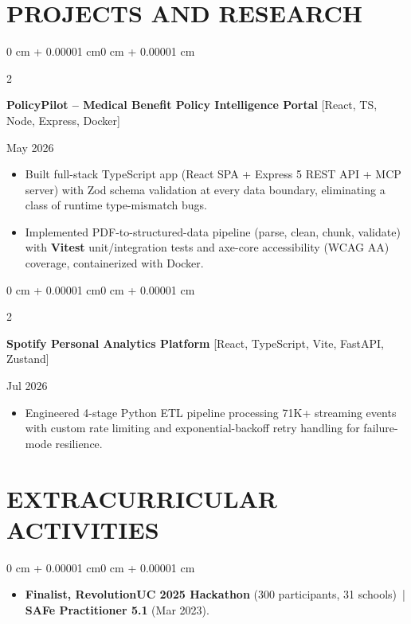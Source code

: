\documentclass[10pt, letterpaper]{article}
\newenvironment{highlights}{
    \begin{itemize}[
        topsep=0.10 cm,
        parsep=0.06 cm,
        partopsep=0pt,
        itemsep=0.06 cm,
        leftmargin=12pt
    ]
}{
    \end{itemize}
}
\newenvironment{onecolentry}{
    \begin{adjustwidth}{0 cm + 0.00001 cm}{0 cm + 0.00001 cm}
}{
    \end{adjustwidth}
}
\newenvironment{twocolentry}[2][]{
    \onecolentry
    \def\secondColumn{#2}
    \setcolumnwidth{\fill, 4.5 cm}
    \begin{paracol}{2}
}{
    \switchcolumn \raggedleft \secondColumn
    \end{paracol}
    \endonecolentry
}
\begin{document}
\section{PROJECTS AND RESEARCH}
\begin{twocolentry}{May 2026}
\textbf{PolicyPilot -- Medical Benefit Policy Intelligence Portal} [React, TS, Node, Express, Docker]
\end{twocolentry}
\begin{highlights}
  \item Built full-stack TypeScript app (React SPA + Express 5 REST API + MCP server) with Zod schema validation at every data boundary, eliminating a class of runtime type-mismatch bugs.
  \item Implemented PDF-to-structured-data pipeline (parse, clean, chunk, validate) with \textbf{Vitest} unit/integration tests and axe-core accessibility (WCAG AA) coverage, containerized with Docker.
\end{highlights}

\vspace{0.12 cm}

\begin{twocolentry}{Jul 2026}
\textbf{Spotify Personal Analytics Platform} [React, TypeScript, Vite, FastAPI, Zustand]
\end{twocolentry}
\begin{highlights}
  \item Engineered 4-stage Python ETL pipeline processing 71K+ streaming events with custom rate limiting and exponential-backoff retry handling for failure-mode resilience.
\end{highlights}

\section{EXTRACURRICULAR ACTIVITIES}
\begin{onecolentry}
\begin{highlights}
  \item \textbf{Finalist, RevolutionUC 2025 Hackathon} (300 participants, 31 schools) \,|\, \textbf{SAFe Practitioner 5.1} (Mar 2023).
\end{highlights}
\end{onecolentry}
\end{document}
